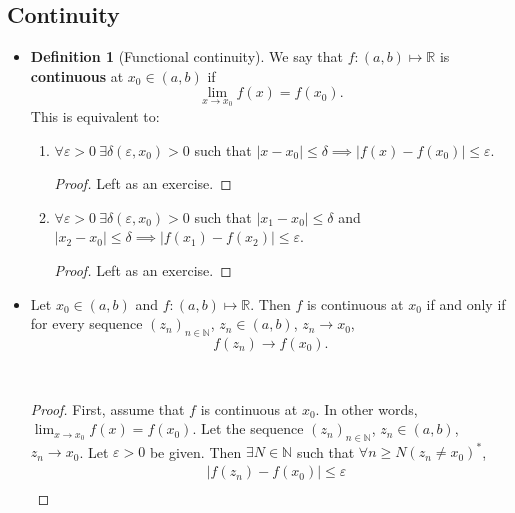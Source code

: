 \documentclass{article}
\newcommand{\R}{\mathbb{R}}
\newcommand{\N}{\mathbb{N}}
\newcommand{\seq}[2]{(#1_{#2})_{#2 \in \N}}
\newcommand{\?}{\stackrel{?}{=}}
\theoremstyle{definition} %
\newtheorem{definition}[subsection]{Definition} %
\begin{document}
\subsection{Continuity}

\begin{itemize}
    \item[]
          \begin{definition}[Functional continuity]
              We say that $f: (a, b) \mapsto \R$ is \textbf{continuous} at $x_0 \in (a, b)$ if
              $$\lim_{x \to x_0} f(x) = f(x_0).$$
              This is equivalent to:
              \begin{enumerate}[label=(\roman*)]
                  \item $\forall \varepsilon > 0 \ \exists \delta(\varepsilon, x_0) > 0$ such that $|x - x_0| \leq \delta \implies |f(x) - f(x_0)| \leq \varepsilon$.
                        \begin{proof}
                            Left as an exercise.
                        \end{proof}
                  \item $\forall \varepsilon > 0 \ \exists \delta(\varepsilon, x_0) > 0$ such that $|x_1 - x_0| \leq \delta$ and $|x_2 - x_0| \leq \delta \implies |f(x_1) - f(x_2)| \leq \varepsilon$.
                        \begin{proof}
                            Left as an exercise.
                        \end{proof}
              \end{enumerate}
          \end{definition}
    \item[]
          \begin{lemma}
              Let $x_0 \in (a, b)$ and $f: (a, b) \mapsto \R$. Then $f$ is continuous at $x_0$ if and only if for every sequence $\seq{z}{n}$, $z_n \in (a, b)$, $z_n \rightarrow x_0$,
              $$f(z_n) \rightarrow f(x_0).$$
          \end{lemma}\
          \begin{proof}
              First, assume that $f$ is continuous at $x_0$. In other words, $\lim_{x \to x_0} f(x) = f(x_0)$. Let the sequence $\seq{z}{n}$, $z_n \in (a, b)$, $z_n \rightarrow x_0$. Let $\varepsilon > 0$ be given. Then $\exists N \in \N$ such that $\forall n \geq N (z_n \neq x_0)^*$,
              \begin{align*}
                           & |f(z_n) - f(x_0)| \leq \varepsilon \\

\end{align*}
\end{proof}
\end{itemize}
\end{document}
